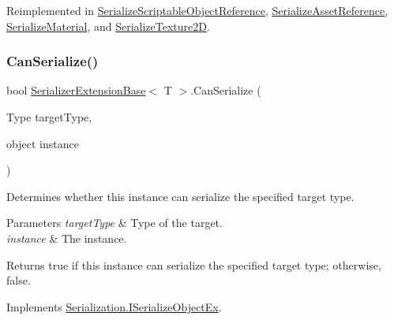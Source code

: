 Reimplemented in \hyperlink{class_serialize_scriptable_object_reference_a830bb74938329482397d7975b8853eaf}{Serialize\+Scriptable\+Object\+Reference}, \hyperlink{class_serialize_asset_reference_a5ea84d0ce141e942750d2b4d33e89d08}{Serialize\+Asset\+Reference}, \hyperlink{class_serialize_material_a86d5a8507905179b0d5cc0ca608c552b}{Serialize\+Material}, and \hyperlink{class_serialize_texture2_d_a4485a35955c52146f174efa44317787e}{Serialize\+Texture2D}.

\mbox{\label{class_serializer_extension_base_af730b106e15a036d8099ebf63d6df543}} 
\subsubsection{\texorpdfstring{Can\+Serialize()}{CanSerialize()}}
{\footnotesize\ttfamily bool \hyperlink{class_serializer_extension_base}{Serializer\+Extension\+Base}$<$ T $>$.Can\+Serialize (\begin{DoxyParamCaption}\item[{Type}]{target\+Type,  }\item[{object}]{instance }\end{DoxyParamCaption})\hspace{0.3cm}{\ttfamily [inline]}}



Determines whether this instance can serialize the specified target type. 


\begin{DoxyParams}{Parameters}
{\em target\+Type} & Type of the target.\\
\hline
{\em instance} & The instance.\\
\hline
\end{DoxyParams}
\begin{DoxyReturn}{Returns}
{\ttfamily true} if this instance can serialize the specified target type; otherwise, {\ttfamily false}.
\end{DoxyReturn}


Implements \hyperlink{interface_serialization_1_1_i_serialize_object_ex_a5a13bf50bde25dc6b1f593da8cb5eb06}{Serialization.\+I\+Serialize\+Object\+Ex}.

\mbox{\label{class_serializer_extension_base_a04524500adb2abafdb0e606148145e07}} 
